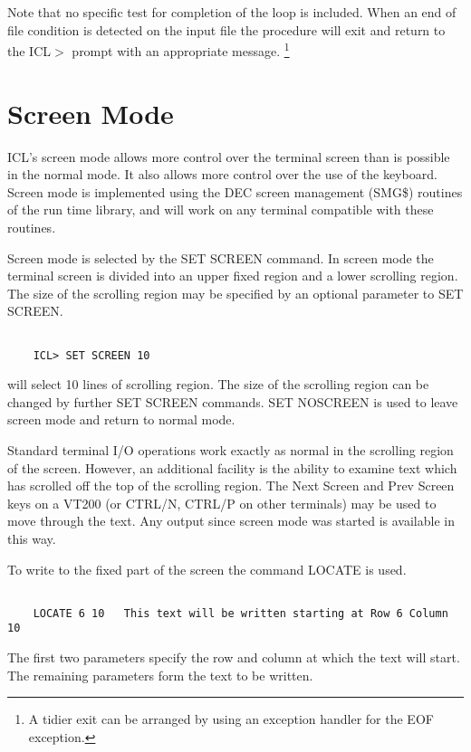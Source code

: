 \documentclass[twoside,11pt]{report}
\newcommand{\xlabel}[1]{}
\begin{document}
Note that no specific test for completion of the loop is included. When an end
of file condition is detected on the input file the procedure will exit and
return to the ICL$>$ prompt with an appropriate message. \footnote{A tidier
exit can be arranged by using an exception handler for the EOF exception.}

\section{\xlabel{screen_mode}Screen Mode}

ICL's screen mode allows more control over the terminal screen than is possible
in the normal mode. It also allows more control over the use of the keyboard.
Screen mode is implemented using the DEC screen management (SMG\$) routines
of the run time library, and will work on any terminal compatible with these
routines.

Screen mode is selected by the SET SCREEN command. In screen mode the terminal
screen is divided into an upper fixed region and a lower scrolling region.
The size of the scrolling region may be specified by an optional parameter
to SET SCREEN.
\begin{verbatim}

    ICL> SET SCREEN 10

\end{verbatim}
will select 10 lines of scrolling region. The size of the scrolling region
can be changed by further SET SCREEN commands. SET NOSCREEN is used to leave
screen mode and return to normal mode.

Standard terminal I/O operations work exactly as normal in the scrolling
region of the screen. However, an additional facility is the ability to
examine text which has scrolled off the top of the scrolling region. The
Next Screen and Prev Screen keys on a VT200 (or CTRL/N, CTRL/P on other
terminals) may be used to move through the text. Any output since screen
mode was started is available in this way.

To write to the fixed part of the screen the command LOCATE is used.
\begin{verbatim}

    LOCATE 6 10   This text will be written starting at Row 6 Column 10

\end{verbatim}
The first two parameters specify the row and column at which the text will
start. The remaining parameters form the text to be written.
\end{document}
